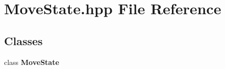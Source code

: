 \section{Move\-State.\-hpp File Reference}
\label{_move_state_8hpp}
\subsection*{Classes}
\begin{DoxyCompactItemize}
\item 
class {\bf Move\-State}
\end{DoxyCompactItemize}
